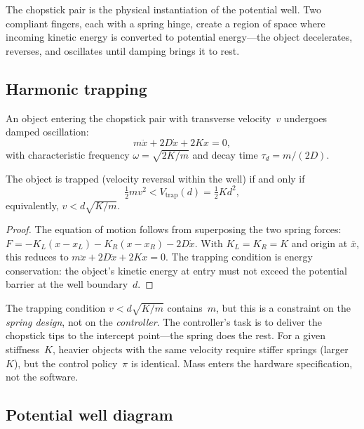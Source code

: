 The chopstick pair is the physical instantiation of the
potential well.  Two compliant fingers, each with a spring
hinge, create a region of space where incoming kinetic energy
is converted to potential energy---the object decelerates,
reverses, and oscillates until damping brings it to rest.

\subsection{Harmonic trapping}

\begin{proposition}
\label{prop:c-trap}
An object entering the chopstick pair with transverse velocity~$v$
undergoes damped oscillation:
\[
  m\ddot{x} + 2D\dot{x} + 2Kx = 0,
\]
with characteristic frequency $\omega = \sqrt{2K/m}$ and decay
time $\tau_d = m/(2D)$.

The object is trapped (velocity reversal within the well) if
and only if
\[
  \tfrac{1}{2}mv^2 < V_{\mathrm{trap}}(d)
  = \tfrac{1}{2}K d^2,
\]
equivalently, $v < d\sqrt{K/m}$.
\end{proposition}

\begin{proof}
The equation of motion follows from superposing the two spring
forces: $F = -K_L(x - x_L) - K_R(x - x_R) - 2D\dot{x}$.
With $K_L = K_R = K$ and origin at $\bar{x}$, this reduces to
$m\ddot{x} + 2D\dot{x} + 2Kx = 0$.  The trapping condition
is energy conservation: the object's kinetic energy at entry
must not exceed the potential barrier at the well boundary~$d$.
\end{proof}

\begin{remark}
The trapping condition $v < d\sqrt{K/m}$ contains~$m$, but
this is a constraint on the \emph{spring design}, not on the
\emph{controller}.  The controller's task is to deliver the
chopstick tips to the intercept point---the spring does the
rest.  For a given stiffness~$K$, heavier objects with the
same velocity require stiffer springs (larger~$K$), but the
control policy~$\pi$ is identical.  Mass enters the hardware
specification, not the software.
\end{remark}

\subsection{Potential well diagram}

